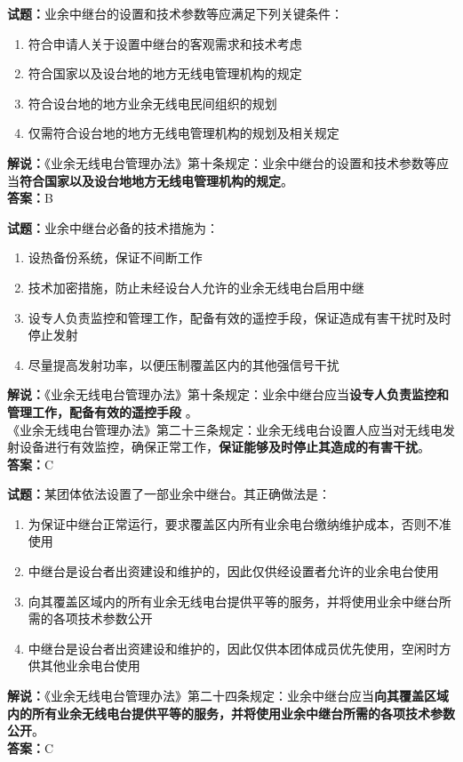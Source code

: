 \documentclass{ctexbook}
\begin{document}
\vspace{1em}

\textbf{试题：}业余中继台的设置和技术参数等应满足下列关键条件：
\begin{enumerate}[leftmargin=3em]
  \item 符合申请人关于设置中继台的客观需求和技术考虑
  \item 符合国家以及设台地的地方无线电管理机构的规定
  \item 符合设台地的地方业余无线电民间组织的规划
  \item 仅需符合设台地的地方无线电管理机构的规划及相关规定
\end{enumerate}
\noindent\textbf{解说：}《业余无线电台管理办法》第十条规定：业余中继台的设置和技术参数等应当\textbf{符合国家以及设台地地方无线电管理机构的规定}。\\\noindent\textbf{答案：}B

\vspace{1em}

\textbf{试题：}业余中继台必备的技术措施为：
\begin{enumerate}[leftmargin=3em]
  \item 设热备份系统，保证不间断工作
  \item 技术加密措施，防止未经设台人允许的业余无线电台启用中继
  \item 设专人负责监控和管理工作，配备有效的遥控手段，保证造成有害干扰时及时停止发射
  \item 尽量提高发射功率，以便压制覆盖区内的其他强信号干扰
\end{enumerate}
\noindent\textbf{解说：}《业余无线电台管理办法》第十条规定：业余中继台应当\textbf{设专人负责监控和管理工作，配备有效的遥控手段 }。\\
《业余无线电台管理办法》第二十三条规定：业余无线电台设置人应当对无线电发射设备进行有效监控，确保正常工作，\textbf{保证能够及时停止其造成的有害干扰}。 \\\noindent\textbf{答案：}C

\vspace{1em}

\textbf{试题：}某团体依法设置了一部业余中继台。其正确做法是：
\begin{enumerate}[leftmargin=3em]
  \item 为保证中继台正常运行，要求覆盖区内所有业余电台缴纳维护成本，否则不准使用
  \item 中继台是设台者出资建设和维护的，因此仅供经设置者允许的业余电台使用
  \item 向其覆盖区域内的所有业余无线电台提供平等的服务，并将使用业余中继台所需的各项技术参数公开
  \item 中继台是设台者出资建设和维护的，因此仅供本团体成员优先使用，空闲时方供其他业余电台使用
\end{enumerate}
\noindent\textbf{解说：}《业余无线电台管理办法》第二十四条规定：业余中继台应当\textbf{向其覆盖区域内的所有业余无线电台提供平等的服务，并将使用业余中继台所需的各项技术参数公开}。\\\noindent\textbf{答案：}C
\end{document}
